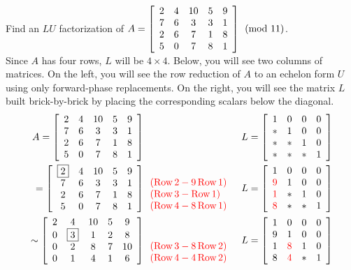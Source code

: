 \begin{Exam}
Find an $LU$ factorization of $A = \mtx{ccccc}{2&4&10&5&9\\7&6&3&3&1\\2&6&7&1&8\\5&0&7&8&1} \pmod{11}$.\\

Since $A$ has four rows, $L$ will be $4\times 4$. Below, you will see two columns of matrices. On the left, you will see the row reduction of $A$ to an echelon form $U$ using only forward-phase replacements. On the right, you will see the matrix $L$ built brick-by-brick by placing the corresponding scalars below the diagonal.
\begin{eqnarray*}
A =\mtx{ccccc}{2&4&10&5&9\\7&6&3&3&1\\2&6&7&1&8\\5&0&7&8&1} \begin{array}{l} \mbox{}\\ \phantom{(\row 2 + 2\row 1)} \\ \mbox{} \\\mbox{} \end{array} && L = \mtx{rrrr}{1&0&0&0\\\ast &1&0&0\\\ast &\ast &1&0\\\ast &\ast &\ast &1}\\
=\mtx{ccccc}{\fbox{$2$}&4&10&5&9\\7&6&3&3&1\\2&6&7&1&8\\5&0&7&8&1}\begin{array}{l} \mbox{}\\\color{red}(\row 2 - 9\row 1) \\\color{red}(\row 3 - \row 1) \\\color{red}(\row 4 - 8\row 1)\end{array}  && L = \mtx{rrrr}{1&0&0&0\\\color{red}9&1&0&0\\\color{red}1&\ast &1&0\\\color{red}8&\ast &\ast &1}\\
\sim \mtx{ccccc}{2&4&10&5&9\\0&\fbox{$3$}&1&2&8\\0&2&8&7&10\\0&1&4&1&6}\begin{array}{l} \mbox{}\\\mbox{} \\\color{red}(\row 3 - 8\row 2) \\\color{red}(\row 4 - 4\row 2)\end{array} && L = \mtx{rrrr}{1&0&0&0\\9&1&0&0\\1&\color{red}8 &1&0\\8&\color{red}4 &\ast &1}\\

\end{eqnarray*}
\end{Exam}
